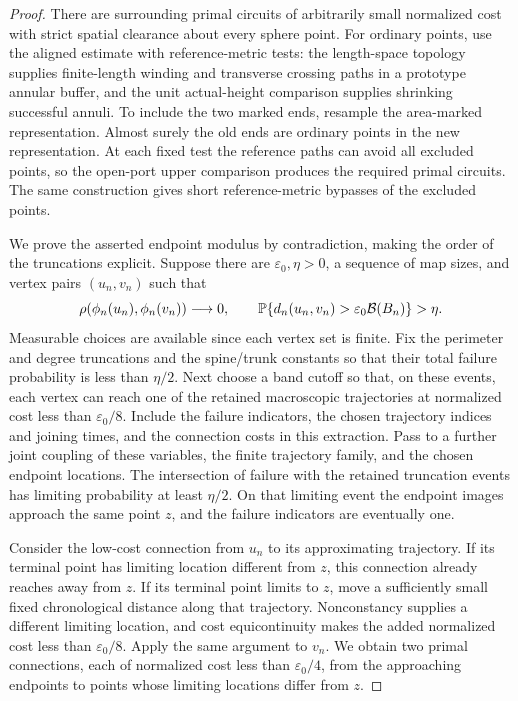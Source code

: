 \begin{proof}

There are surrounding primal circuits of arbitrarily small normalized cost
with strict spatial clearance about every sphere point. For ordinary points,
use the aligned estimate with reference-metric tests: the length-space topology
supplies finite-length winding and transverse crossing paths in a prototype
annular buffer, and the unit actual-height comparison supplies shrinking
successful annuli. To include the two marked ends, resample the area-marked
representation. Almost surely the old ends are ordinary points in the new
representation. At each fixed test the reference paths can avoid all excluded
points, so the open-port upper comparison produces the required primal
circuits. The same construction gives short reference-metric bypasses of
the excluded points.

We prove the asserted endpoint modulus by contradiction, making the order
of the truncations explicit. Suppose there are $\varepsilon_0,\eta>0$, a
sequence of map sizes, and vertex pairs $(u_n,v_n)$ such that
\[
 \rho(\phi_n(u_n),\phi_n(v_n))\longrightarrow0,
 \qquad
 \mathbb P\{d_n(u_n,v_n)>\varepsilon_0\mathcal B(B_n)\}>\eta.
\]
Measurable choices are available since each vertex set is finite. Fix the
perimeter and degree truncations and the spine/trunk constants so that their
total failure probability is less than $\eta/2$. Next choose a band cutoff
so that, on these events, each vertex can reach one of the retained
macroscopic trajectories at normalized cost less than $\varepsilon_0/8$.
Include the failure indicators, the chosen trajectory indices and joining
times, and the connection costs in this extraction. Pass to a further
joint coupling of these variables, the finite trajectory family, and the
chosen endpoint locations. The
intersection of failure with the retained truncation events has limiting
probability at least $\eta/2$. On that limiting event the endpoint images
approach the same point $z$, and the failure indicators are eventually one.

Consider the low-cost connection from $u_n$ to its approximating trajectory.
If its terminal point has limiting location different from $z$, this
connection already reaches away from $z$. If its terminal point limits to
$z$, move a sufficiently small fixed chronological distance along that
trajectory. Nonconstancy supplies a different limiting location, and cost
equicontinuity makes the added normalized cost less than
$\varepsilon_0/8$. Apply the same argument to $v_n$. We obtain two primal
connections, each of normalized cost less than $\varepsilon_0/4$, from the
approaching endpoints to points whose limiting locations differ from $z$.


\end{proof}
